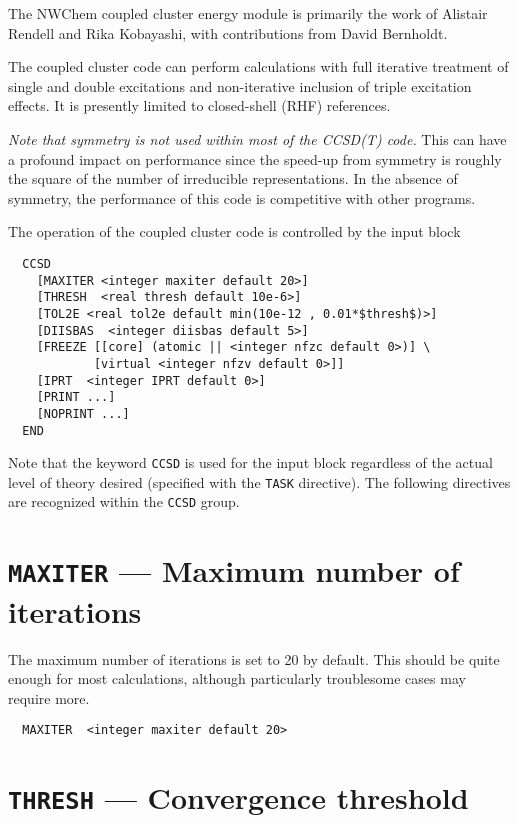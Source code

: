 %
%
\label{sec:ccsd}

The NWChem coupled cluster energy module is primarily the work of
Alistair Rendell and Rika Kobayashi, with contributions from David
Bernholdt.

The coupled cluster code can perform calculations with full iterative
treatment of single and double excitations and non-iterative inclusion
of triple excitation effects.  It is presently limited to closed-shell
(RHF) references.

{\em Note that symmetry is not used within most of the CCSD(T) code.}
This can have a profound impact on performance since the speed-up from
symmetry is roughly the square of the number of irreducible
representations.  In the absence of symmetry, the performance of this
code is competitive with other programs.

The operation of the coupled cluster code is controlled by the input
block
\begin{verbatim}
  CCSD
    [MAXITER <integer maxiter default 20>]
    [THRESH  <real thresh default 10e-6>]
    [TOL2E <real tol2e default min(10e-12 , 0.01*$thresh$)>]
    [DIISBAS  <integer diisbas default 5>]
    [FREEZE [[core] (atomic || <integer nfzc default 0>)] \
            [virtual <integer nfzv default 0>]]
    [IPRT  <integer IPRT default 0>]
    [PRINT ...]
    [NOPRINT ...]
  END
\end{verbatim}
Note that the keyword \verb+CCSD+ is used for the input block
regardless of the actual level of theory desired (specified with the
\verb+TASK+ directive).  The following directives are recognized
within the \verb+CCSD+ group.

\section{{\tt MAXITER} --- Maximum number of iterations}

The maximum number of iterations is set to 20 by default.  This should
be quite enough for most calculations, although particularly
troublesome cases may require more.

\begin{verbatim}
  MAXITER  <integer maxiter default 20>
\end{verbatim}

\section{{\tt THRESH} --- Convergence threshold}

